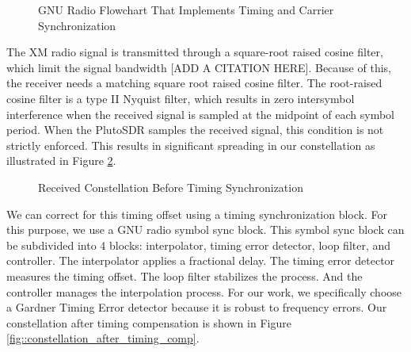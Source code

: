 \documentclass[conference,onecolumn]{IEEEtran}
\begin{document}
\begin{figure}[H]
	\centerline{}
	\caption{GNU Radio Flowchart That Implements Timing and Carrier Synchronization}
	\label{fig::timing_carrier_sync}
\end{figure}

The XM radio signal is transmitted through a square-root raised cosine filter, which limit the signal bandwidth [ADD A CITATION HERE]. Because of this, the receiver needs a matching square root raised cosine filter. The root-raised cosine filter is a type II Nyquist filter, which results in zero intersymbol interference when the received signal is sampled at the midpoint of each symbol period. When the PlutoSDR samples the received signal, this condition is not strictly enforced. This results in significant spreading in our constellation as illustrated in Figure \ref{fig::constellation_no_timing_comp}.

\begin{figure}[H]
	\centerline{}
	\caption{Received Constellation Before Timing Synchronization}
	\label{fig::constellation_no_timing_comp}
\end{figure}

We can correct for this timing offset using a timing synchronization block. For this purpose, we use a GNU radio symbol sync block. This symbol sync block can be subdivided into 4 blocks: interpolator, timing error detector, loop filter, and controller. The interpolator applies a fractional delay. The timing error detector measures the timing offset. The loop filter stabilizes the process. And the controller manages the interpolation process. For our work, we specifically choose a Gardner Timing Error detector because it is robust to frequency errors. Our constellation after timing compensation is shown in Figure \ref{fig::constellation_after_timing_comp}.
\end{document}
